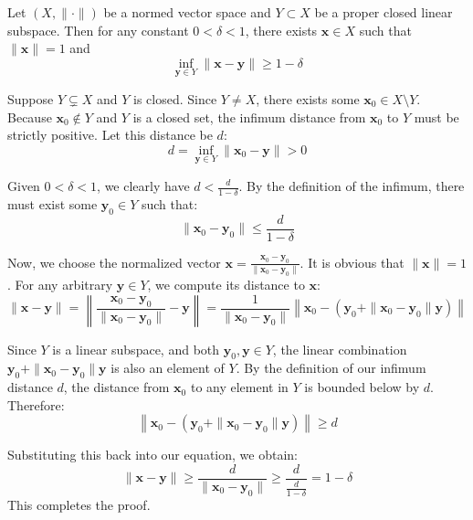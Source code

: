 
\begin{lemma}[Riesz]
    Let $(X, \|\cdot\|)$ be a normed vector space and $Y \subset X$ be a proper closed linear subspace. Then for any constant $0 < \delta < 1$, there exists $\mathbf{x} \in X$ such that $\|\mathbf{x}\| = 1$ and 
    \[ \inf_{\mathbf{y} \in Y} \|\mathbf{x} - \mathbf{y}\| \ge 1 - \delta \]
\end{lemma}

\begin{pfbox}
    Suppose $Y \subsetneq X$ and $Y$ is closed. Since $Y \neq X$, there exists some $\mathbf{x}_0 \in X \setminus Y$.
    Because $\mathbf{x}_0 \notin Y$ and $Y$ is a closed set, the infimum distance from $\mathbf{x}_0$ to $Y$ must be strictly positive. Let this distance be $d$:
    \[ d = \inf_{\mathbf{y} \in Y} \|\mathbf{x}_0 - \mathbf{y}\| > 0 \]
    
    Given $0 < \delta < 1$, we clearly have $\displaystyle d < \frac{d}{1-\delta}$. By the definition of the infimum, there must exist some $\mathbf{y}_0 \in Y$ such that:
    \[ \|\mathbf{x}_0 - \mathbf{y}_0\| \le \frac{d}{1-\delta} \]
    
    Now, we choose the normalized vector $\displaystyle \mathbf{x} = \frac{\mathbf{x}_0 - \mathbf{y}_0}{\|\mathbf{x}_0 - \mathbf{y}_0\|}$. It is obvious that $\|\mathbf{x}\| = 1$.
    For any arbitrary $\mathbf{y} \in Y$, we compute its distance to $\mathbf{x}$:
    \[ \|\mathbf{x} - \mathbf{y}\| = \left\| \frac{\mathbf{x}_0 - \mathbf{y}_0}{\|\mathbf{x}_0 - \mathbf{y}_0\|} - \mathbf{y} \right\| = \frac{1}{\|\mathbf{x}_0 - \mathbf{y}_0\|} \left\| \mathbf{x}_0 - \left( \mathbf{y}_0 + \|\mathbf{x}_0 - \mathbf{y}_0\|\mathbf{y} \right) \right\| \]
    
    Since $Y$ is a linear subspace, and both $\mathbf{y}_0, \mathbf{y} \in Y$, the linear combination $\mathbf{y}_0 + \|\mathbf{x}_0 - \mathbf{y}_0\|\mathbf{y}$ is also an element of $Y$.
    By the definition of our infimum distance $d$, the distance from $\mathbf{x}_0$ to any element in $Y$ is bounded below by $d$. Therefore:
    \[ \left\| \mathbf{x}_0 - \left( \mathbf{y}_0 + \|\mathbf{x}_0 - \mathbf{y}_0\|\mathbf{y} \right) \right\| \ge d \]
    
    Substituting this back into our equation, we obtain:
    \[ \|\mathbf{x} - \mathbf{y}\| \ge \frac{d}{\|\mathbf{x}_0 - \mathbf{y}_0\|} \ge \frac{d}{\displaystyle \frac{d}{1-\delta}} = 1 - \delta \]
    This completes the proof.
\end{pfbox}

